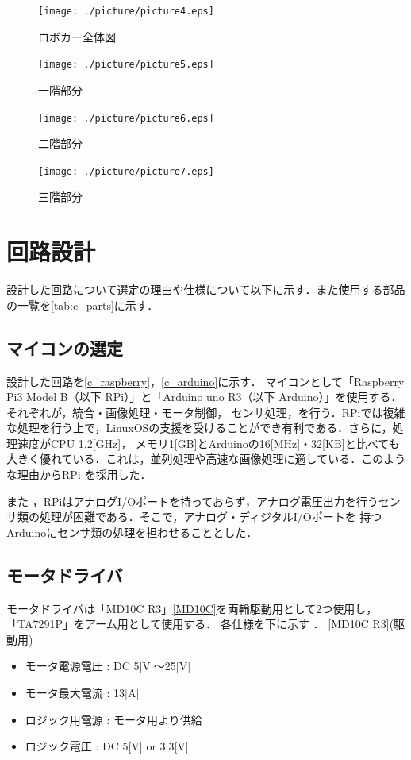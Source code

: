 \documentclass[10pt,a4j]{jarticle}
\begin{document}
\begin{figure}[hb]
 \begin{center}
  \texttt{[image: ./picture/picture4.eps]}
  \caption{ロボカー全体図}
  \label{fig:robocar}
 \end{center}
\end{figure}

\begin{figure}[H]
 \begin{center}
  \texttt{[image: ./picture/picture5.eps]}
  \caption{一階部分}
  \label{fig:1F}
 \end{center}
\end{figure}

\begin{figure}[H]
 \begin{center}
  \texttt{[image: ./picture/picture6.eps]}
  \caption{二階部分}
  \label{fig:2F}
 \end{center}
\end{figure}

\begin{figure}[H]
 \begin{center}
  \texttt{[image: ./picture/picture7.eps]}
  \caption{三階部分}
  \label{fig:3F}
 \end{center}
\end{figure}

\section{回路設計}
設計した回路について選定の理由や仕様について以下に示す．また使用する部品の一覧を\ref{tab:c_parts}に示す．
\subsection{マイコンの選定}
設計した回路を\ref{c_raspberry}，\ref{c_arduino}に示す．
マイコンとして「Raspberry Pi3 Model B（以下 RPi）」と「Arduino uno R3（以下 Arduino）」を使用する．それぞれが，統合・画像処理・モータ制御，
センサ処理，を行う．RPiでは複雑な処理を行う上で，LinuxOSの支援を受けることができ有利である．さらに，処理速度がCPU 1.2[GHz]，
メモリ1[GB]とArduinoの16[MHz]・32[KB]と比べても大きく優れている．これは，並列処理や高速な画像処理に適している．このような理由からRPi
を採用した．

また ，RPiはアナログI/Oポートを持っておらず，アナログ電圧出力を行うセンサ類の処理が困難である．そこで，アナログ・ディジタルI/Oポートを
持つArduinoにセンサ類の処理を担わせることとした．
\subsection{モータドライバ}
モータドライバは「MD10C R3」\ref{MD10C}を両輪駆動用として2つ使用し，「TA7291P」をアーム用として使用する．
各仕様を下に示す
．
[MD10C R3](駆動用)
\begin{itemize}
 \item モータ電源電圧 : DC 5[V]$〜$25[V]
 \item モータ最大電流 : 13[A]
 \item ロジック用電源 : モータ用より供給
 \item ロジック電圧   : DC 5[V] or 3.3[V]
\end{itemize}
\end{document}
